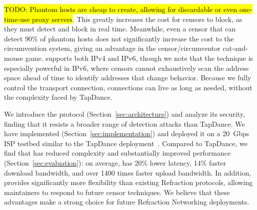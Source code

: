 \documentclass[sigconf,anonymous]{acmart}
\newcommand{\TODO}[1]{\hl{TODO: #1}\xspace}
\begin{document}
\TODO{Phantom hosts are cheap to create, allowing for discardable or even one-time-use
proxy servers}. This greatly increases the cost for censors to
block, as they must detect and block in real time. Meanwhile, even a censor that
can detect 90\% of phantom hosts does not significantly increase the cost to the
circumvention system, giving \scheme an advantage in the censor/circumventor
cat-and-mouse game.
\scheme supports both IPv4 and IPv6,
though we note that the technique is especially
powerful in IPv6, where censors cannot exhaustively scan the address space
ahead of time to identify addresses that change behavior.
Because we fully control the transport connection, connections can live as
long as needed, without the complexity faced by TapDance.




We introduce the \scheme protocol (Section~\ref{sec:architecture})
and analyze its security, finding that it resists a broader
range of detection attacks than TapDance.
We have implemented \scheme (Section~\ref{sec:implementation})
and deployed it on a 20~Gbps ISP testbed similar to the TapDance
deployment~\cite{frolov2017isp}.  Compared to TapDance, we find that
\scheme has reduced complexity and substantially improved performance
(Section~\ref{sec:evaluation}): on average, \scheme has 20\% lower latency,
14\% faster download bandwidth, and over 1400 times faster upload bandwidth.
In addition, \scheme provides significantly
more flexibility than existing Refraction protocols, allowing maintainers to
respond to future censor techniques.
We believe that these advantages
make \scheme a strong choice for future Refraction Networking deployments.

\end{document}

